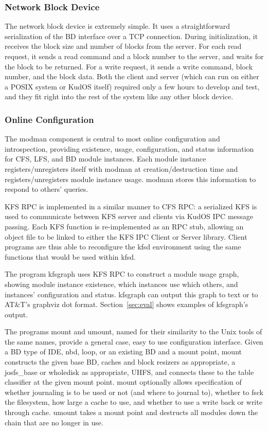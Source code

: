 \subsubsection{Network Block Device}
\label{sec:solution:impl:nbd}

The network block device is extremely simple. It uses a straightforward
serialization of the BD interface over a TCP connection. During initialization,
it receives the block size and number of blocks from the server. For each read
request, it sends a read command and a block number to the server, and waits for
the block to be returned. For a write request, it sends a write command, block
number, and the block data. Both the client and server (which can run on either
a POSIX system or KudOS itself) required only a few hours to develop and test,
and they fit right into the rest of the system like any other block device.

\subsubsection{Online Configuration}
\label{sec:solution:impl:online}

The modman component is central to most online configuration and introspection,
providing existence, usage, configuration, and status information for CFS, LFS,
and BD module instances. Each module instance registers/unregisters itself with
modman at creation/destruction time and registers/unregisters module instance
usage. modman stores this information to respond to others' queries.

KFS RPC is implemented in a similar manner to CFS RPC: a serialized KFS is used
to communicate between KFS server and clients via KudOS IPC message passing.
Each KFS function is re-implemented as an RPC stub, allowing an object file to
be linked to either the KFS IPC Client or Server library. Client programs are
thus able to reconfigure the kfsd environment using the same functions that
would be used within kfsd.

The program kfsgraph uses KFS RPC to construct a module usage graph, showing
module instance existence, which instances use which others, and instances'
configuration and status. kfsgraph can output this graph to text or to AT\&T's
graphviz dot format. Section~\ref{sec:eval} shows examples of kfsgraph's output.

The programs mount and umount, named for their similarity to the Unix tools of
the same names, provide a general case, easy to use configuration interface.
Given a BD type of IDE, nbd, loop, or an existing BD and a mount point, mount
constructs the given base BD, caches and block resizers as appropriate, a
josfs\_base or wholedisk as appropriate, UHFS, and connects these to the table
classifier at the given mount point. mount optionally allows specification of
whether journaling is to be used or not (and where to journal to), whether to
fsck the filesystem, how large a cache to use, and whether to use a write back
or write through cache. umount takes a mount point and destructs all modules
down the chain that are no longer in use.
